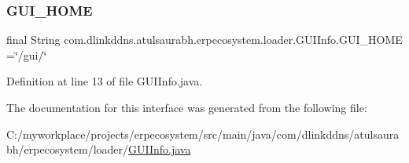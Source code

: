 \subsubsection{\texorpdfstring{G\+U\+I\+\_\+\+H\+O\+ME}{GUI\_HOME}}
{\footnotesize\ttfamily final String com.\+dlinkddns.\+atulsaurabh.\+erpecosystem.\+loader.\+G\+U\+I\+Info.\+G\+U\+I\+\_\+\+H\+O\+ME =\char`\"{}/gui/\char`\"{}\hspace{0.3cm}{\ttfamily [static]}}



Definition at line 13 of file G\+U\+I\+Info.\+java.



The documentation for this interface was generated from the following file\+:\begin{DoxyCompactItemize}
\item 
C\+:/myworkplace/projects/erpecosystem/src/main/java/com/dlinkddns/atulsaurabh/erpecosystem/loader/\mbox{\hyperlink{_g_u_i_info_8java}{G\+U\+I\+Info.\+java}}\end{DoxyCompactItemize}
